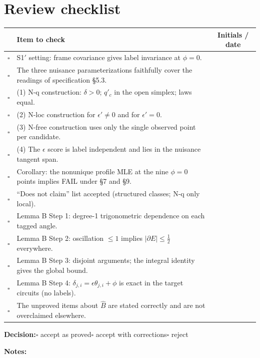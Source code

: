 \documentclass[11pt,a4paper]{article}
\theoremstyle{plain}
\theoremstyle{definition}
\theoremstyle{remark}
\newcommand{\eps}{\epsilon}
\begin{document}
\section{Review checklist}
\renewcommand{\arraystretch}{1.6}
\noindent\begin{tabularx}{\linewidth}{@{}c>{\raggedright\arraybackslash}Xc@{}}
\toprule
& Item to check & Initials / date \\
\midrule
$\square$ & S1$'$ setting: frame covariance gives label invariance at $\phi=0$. & \\
$\square$ & The three nuisance parameterizations faithfully cover the readings of specification \S5.3. & \\
$\square$ & (1) N-q construction: $\delta>0$; $q'_c$ in the open simplex; laws equal. & \\
$\square$ & (2) N-loc construction for $\eps'\neq0$ and for $\eps'=0$. & \\
$\square$ & (3) N-free construction uses only the single observed point per candidate. & \\
$\square$ & (4) The $\eps$ score is label independent and lies in the nuisance tangent span. & \\
$\square$ & Corollary: the nonunique profile MLE at the nine $\phi=0$ points implies FAIL under \S7 and \S9. & \\
$\square$ & ``Does not claim'' list accepted (structured classes; N-q only local). & \\
$\square$ & Lemma B Step 1: degree-1 trigonometric dependence on each tagged angle. & \\
$\square$ & Lemma B Step 2: oscillation $\le1$ implies $|\partial E|\le\tfrac12$ everywhere. & \\
$\square$ & Lemma B Step 3: disjoint arguments; the integral identity gives the global bound. & \\
$\square$ & Lemma B Step 4: $\delta_{j,i}=\eps\theta_{j,i}+\phi$ is exact in the target circuits (no labels). & \\
$\square$ & The unproved items about $\hat B$ are stated correctly and are not overclaimed elsewhere. & \\
\bottomrule
\end{tabularx}

\vspace{14pt}
\textbf{Decision:}\quad $\square$ accept as proved\quad $\square$ accept with corrections\quad $\square$ reject

\vspace{10pt}
\textbf{Notes:}
\end{document}
